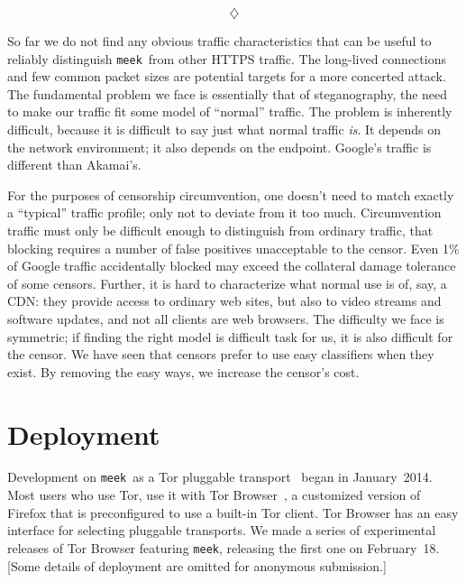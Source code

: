 \documentclass[conference]{IEEEtran}
\newcommand{\meek}{\texttt{meek}\xspace}
\newcommand{\lbl}{ResearchLab\xspace}
\begin{document}


$$\diamondsuit$$

So far we do not find any obvious traffic characteristics that can be useful to reliably distinguish \meek\
from other HTTPS traffic.
The long-lived connections and few common packet sizes are
potential targets for a more concerted attack.
The fundamental problem we face is essentially that of steganography,
the need to make our traffic fit some model of ``normal'' traffic.
The problem is inherently difficult,
because it is difficult to say just what normal traffic \emph{is}.
It depends on the network environment;
it also depends on the endpoint.
Google's traffic is different than Akamai's.

For the purposes of censorship circumvention,
one doesn't need to match exactly a ``typical'' traffic profile;
only not to deviate from it too much.
Circumvention traffic must only be difficult enough to distinguish from ordinary traffic,
that blocking requires a number of false positives unacceptable to the censor.
Even 1\% of Google traffic accidentally blocked may exceed the collateral damage tolerance of some censors.
Further, it is hard to characterize what normal use is of, say, a CDN:
they provide access to ordinary web sites,
but also to video streams and software updates,
and not all clients are web browsers.
The difficulty we face is symmetric;
if finding the right model is difficult task for us,
it is also difficult for the censor.
We have seen that censors prefer to use easy classifiers when they exist.
By removing the easy ways, we increase the censor's cost.

\section{Deployment}
\label{sec:deployment}

Development on \meek\ as a Tor pluggable transport~\cite{pt} began in January~2014.
Most users who use Tor, use it with Tor Browser~\cite{torbrowser},
a customized version of Firefox that is
preconfigured to use a built-in Tor client.
Tor Browser has an easy interface for selecting pluggable transports.
We made a series of experimental releases of Tor Browser featuring \meek,
releasing the first one on February~18.
[Some details of deployment are omitted for anonymous submission.]
\end{document}
